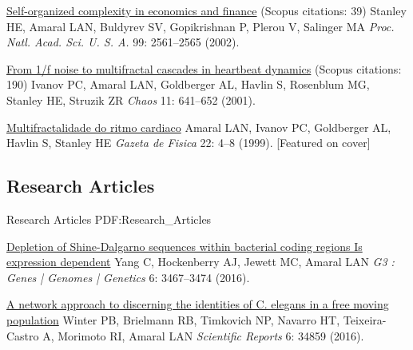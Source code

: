 \NumberedItem{\makebox[0.8cm][r]{[3]}}
\href{/people/amaral/self-organized-complexity-in-economics-and-finance}
{Self-organized complexity in economics and finance}
    (Scopus citations: 39)
\newline
Stanley HE, Amaral LAN, Buldyrev SV, Gopikrishnan P, Plerou V, Salinger MA
\newline
\textit{Proc. Natl. Acad. Sci. U. S. A.}
    99:
2561--2565 (2002).
\newline
\Gap
~
\Gap

\NumberedItem{\makebox[0.8cm][r]{[2]}}
\href{/people/amaral/from-1f-noise-to-multifractal-cascades-in-heartbeat-dynamics}
{From 1/f noise to multifractal cascades in heartbeat dynamics}
    (Scopus citations: 190)
\newline
Ivanov PC, Amaral LAN, Goldberger AL, Havlin S, Rosenblum MG, Stanley HE, Struzik ZR
\newline
\textit{Chaos}
    11:
641--652 (2001).
\newline
\Gap
~
\Gap

\NumberedItem{\makebox[0.8cm][r]{[1]}}
\href{False}
{Multifractalidade do ritmo cardiaco}
\newline
Amaral LAN, Ivanov PC, Goldberger AL, Havlin S, Stanley HE 
\newline
\textit{Gazeta de Fisica }
    22:
4--8  (1999).
    [Featured on cover]
\newline
\Gap
~
\Gap

\vspace*{0.2cm}\subsection
{Research Articles}
{Research Articles}
{PDF:Research_Articles}

\GapNoBreak
\NumberedItem{\makebox[0.8cm][r]{[118]}}
\href{/people/amaral/depletion-shine-dalgarno-sequences-within-bacterial-coding-regions-expression-dependent}
{Depletion of Shine-Dalgarno sequences within bacterial coding regions Is expression dependent}
\newline
Yang C, Hockenberry AJ, Jewett MC, Amaral LAN
\newline
\textit{G3 : Genes | Genomes | Genetics}
    6:
3467--3474 (2016).
\newline
\Gap
~
\Gap

\NumberedItem{\makebox[0.8cm][r]{[117]}}
\href{/people/amaral/network-approach-discerning-identities-c-elegans-free-moving-population}
{A network approach to discerning the identities of C. elegans in a free moving population}
\newline
Winter PB, Brielmann RB, Timkovich NP, Navarro HT, Teixeira-Castro A, Morimoto RI, Amaral LAN
\newline
\textit{Scientific Reports}
    6:
34859 (2016).
\newline
\Gap
~
\Gap

